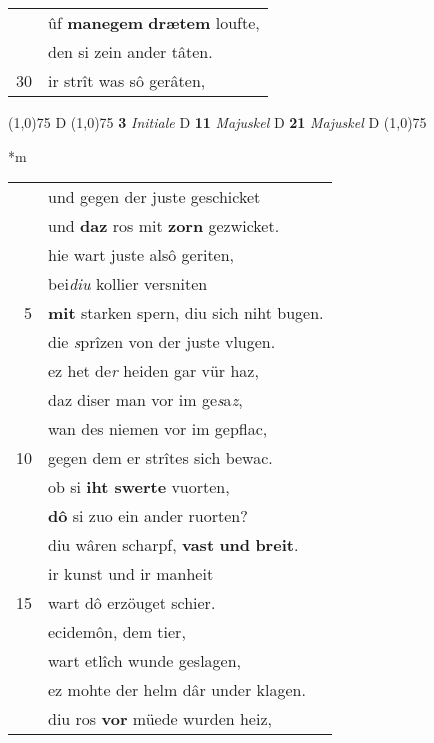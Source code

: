 \documentclass[8pt,a4paper,notitlepage]{article}
\begin{document}
\begin{table}[ht]
\begin{minipage}[t]{0.5\linewidth}
\begin{tabular}{rl}
 & ûf \textbf{manegem} \textbf{drætem} loufte,\\ 
 & den si zein ander tâten.\\ 
30 & ir strît was sô gerâten,\\ 
\end{tabular}
\scriptsize
\line(1,0){75} \newline
D \newline
\line(1,0){75} \newline
\textbf{3} \textit{Initiale} D  \textbf{11} \textit{Majuskel} D  \textbf{21} \textit{Majuskel} D  \newline
\line(1,0){75} \newline
\newline
\end{minipage}
\hspace{0.5cm}
\begin{minipage}[t]{0.5\linewidth}
\small
\begin{center}*m
\end{center}
\begin{tabular}{rl}
 & und gegen der juste geschicket\\ 
 & und \textbf{daz} ros mit \textbf{zorn} gezwicket.\\ 
 & hie wart juste alsô geriten,\\ 
 & bei\textit{diu} kollier versniten\\ 
5 & \textbf{mit} starken spern, diu sich niht bugen.\\ 
 & die \textit{s}prîzen von der juste vlugen.\\ 
 & ez het de\textit{r} heiden gar vür haz,\\ 
 & daz diser man vor im ge\textit{s}a\textit{z},\\ 
 & wan des niemen vor im gepflac,\\ 
10 & gegen dem er strîtes sich bewac.\\ 
 & ob si \textbf{iht swerte} vuorten,\\ 
 & \textbf{dô} si zuo ein ander ruorten?\\ 
 & diu wâren scharpf, \textbf{vast} \textbf{und} \textbf{breit}.\\ 
 & ir kunst und ir manheit\\ 
15 & wart dô erzöuget schier.\\ 
 & ecidemôn, dem tier,\\ 
 & wart etlîch wunde geslagen,\\ 
 & ez mohte der helm dâr under klagen.\\ 
 & diu ros \textbf{vor} müede wurden heiz,\\ 

\end{tabular}
\end{minipage}
\end{table}
\end{document}

